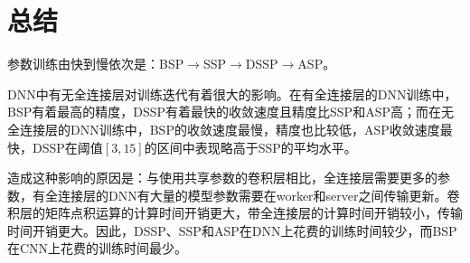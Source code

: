 \documentclass[11pt]{article}
\begin{document}
    \section{总结}

    参数训练由快到慢依次是：BSP$\rightarrow$SSP$\rightarrow$DSSP$\rightarrow$ASP。

    DNN中有无全连接层对训练迭代有着很大的影响。在有全连接层的DNN训练中，BSP有着最高的精度，DSSP有着最快的收敛速度且精度比SSP和ASP高；而在无全连接层的DNN训练中，BSP的收敛速度最慢，精度也比较低，ASP收敛速度最快，DSSP在阈值$[3, 15]$的区间中表现略高于SSP的平均水平。

    造成这种影响的原因是：与使用共享参数的卷积层相比，全连接层需要更多的参数，有全连接层的DNN有大量的模型参数需要在worker和server之间传输更新。卷积层的矩阵点积运算的计算时间开销更大，带全连接层的计算时间开销较小，传输时间开销更大。因此，DSSP、SSP和ASP在DNN上花费的训练时间较少，而BSP在CNN上花费的训练时间最少。
\end{document}
